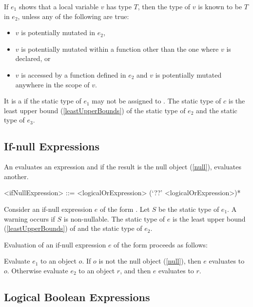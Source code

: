 \documentclass[makeidx]{article}
\begin{document}
{\LMHash{}%
If $e_1$ shows that a local variable $v$ has type $T$,
then the type of $v$ is known to be $T$ in $e_2$,
unless any of the following are true:
\begin{itemize}
\item $v$ is potentially mutated in $e_2$,
\item $v$ is potentially mutated within a function other
  than the one where $v$ is declared, or
\item $v$ is accessed by a function defined in $e_2$ and
  $v$ is potentially mutated anywhere in the scope of $v$.
\end{itemize}

\LMHash{}%
It is a  if
the static type of $e_1$ may not be assigned to .
The static type of $c$ is the least upper bound (\ref{leastUpperBounds}) of
the static type of $e_2$ and the static type of $e_3$.


\subsection{If-null Expressions}

\LMHash{}%
An  evaluates an expression and
if the result is the null object (\ref{null}), evaluates another.

\begin{grammar}
<ifNullExpression> ::= <logicalOrExpression> (`??' <logicalOrExpression>)*
\end{grammar}

\LMHash{}%
Consider an if-null expression $e$ of the form .
Let $S$ be the static type of $e_1$.
A warning occurs if $S$ is non-nullable.
The static type of $e$ is the least upper bound
(\ref{leastUpperBounds})
of  and the static type of $e_2$.

\LMHash{}%
Evaluation of an if-null expression $e$ of the form 
proceeds as follows:

\LMHash{}%
Evaluate $e_1$ to an object $o$.
If $o$ is not the null object (\ref{null}), then $e$ evaluates to $o$.
Otherwise evaluate $e_2$ to an object $r$,
and then $e$ evaluates to $r$.


\subsection{Logical Boolean Expressions}

}
\end{document}
